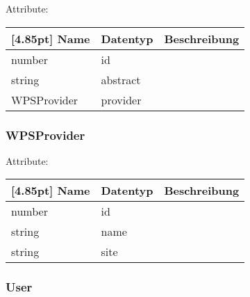     		Attribute:
            \begin{center}
            	\renewcommand{\arraystretch}{1.5}
                \setlength\tabcolsep{5pt}
            	\begin{tabularx}{\textwidth}{|l|l|X|}
            		\hline
                    \rowcolor[gray]{0.75}[4.85pt]            		
                    Name & Datentyp & Beschreibung \\ \hline
            		number & id &  \\ \hline
            		string & abstract &  \\ \hline
            		WPSProvider & provider &  \\ \hline
            	\end{tabularx}
            \end{center}
                
    		\subsubsection{WPSProvider}
    		
    		Attribute:
            \begin{center}
            	\renewcommand{\arraystretch}{1.5}
                \setlength\tabcolsep{5pt}
            	\begin{tabularx}{\textwidth}{|l|l|X|}
            		\hline
                    \rowcolor[gray]{0.75}[4.85pt]            		
                    Name & Datentyp & Beschreibung \\ \hline
            		number & id &  \\ \hline
            		string & name &  \\ \hline
            		string & site &  \\ \hline
            	\end{tabularx}
            \end{center}
                
    		\subsubsection{User}
            
